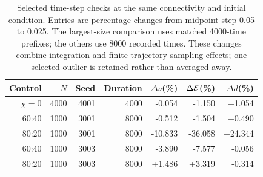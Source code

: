 \begin{table}[htp]
\centering
\small
\caption{Selected time-step checks at the same connectivity and initial
condition. Entries are percentage changes from midpoint step 0.05 to 0.025.
The largest-size comparison uses matched 4000-time prefixes; the others use
8000 recorded times. These changes combine integration and finite-trajectory
sampling effects; one selected outlier is retained rather than averaged away.}
\label{tab:time_step_checks}
\begin{tabular}{rrrrrrr}
\toprule
Control&$N$&Seed&Duration&$\Delta\nu$(\%)&$\Delta\mathcal E$(\%)&$\Delta d$(\%)\\
\midrule
$\chi=0$&4000&4001&4000&-0.054&-1.150&+1.054\\
60:40&1000&3001&8000&-0.512&-1.504&+0.490\\
80:20&1000&3001&8000&-10.833&-36.058&+24.344\\
60:40&1000&3003&8000&-3.890&-7.577&-0.056\\
80:20&1000&3003&8000&+1.486&+3.319&-0.314\\
\bottomrule
\end{tabular}
\end{table}
